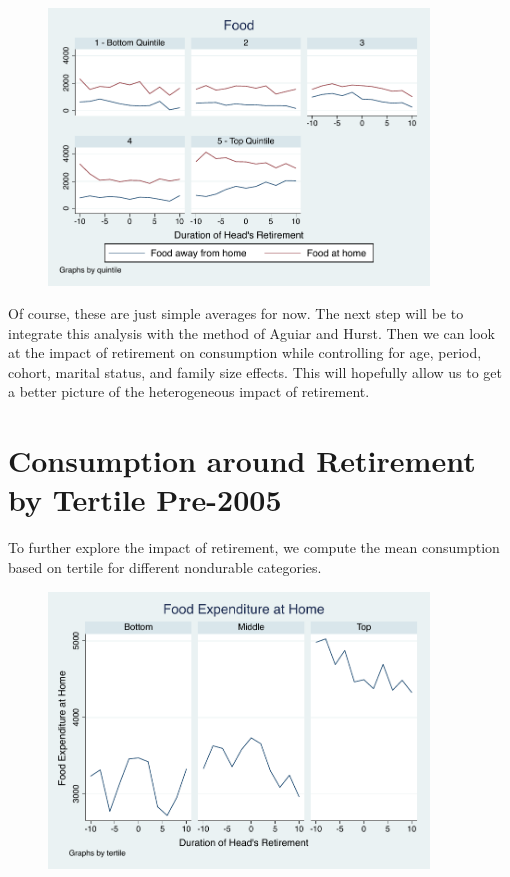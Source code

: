 \documentclass[11pt,onecolumn]{article}
\begin{document}
\begin{figure}[h]
	\centering
	\includegraphics[width=0.9\textwidth]{../ConsumptionPostRetirement/food.pdf}
\end{figure}


Of course, these are just simple averages for now. The next step will be to integrate this analysis with the method of Aguiar and Hurst. Then we can look at the impact of retirement on consumption while controlling for age, period, cohort, marital status, and family size effects. This will hopefully allow us to get a better picture of the heterogeneous impact of retirement.

\section{Consumption around Retirement by Tertile Pre-2005}

To further explore the impact  of retirement, we compute the mean consumption based on tertile for different nondurable categories. 

\begin{figure}[h]
	\centering
	\includegraphics[width=0.9\textwidth]{../ConsumptionPostRetirement/Tertile_1/total_foodexp_home_real.pdf}
\end{figure}
\end{document}
